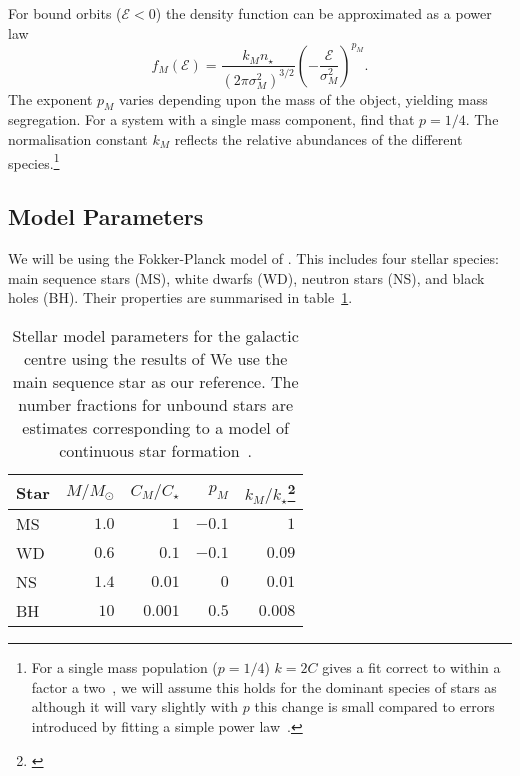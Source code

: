 \documentclass[useAMS,usedcolumn,usegraphicx,usenatbib]{mn2e}
\newcommand{\tabref}[1]{table~\ref{tab:#1}}
\begin{document}
For bound orbits ($\mathcal{E} < 0$) the density function can be approximated as a power law
\begin{equation}
f_M(\mathcal{E}) = \frac{k_M n_\star}{(2\pi\sigma_M^2)^{3/2}}\left(-\frac{\mathcal{E}}{\sigma_M^2}\right)^{p_M}.
\end{equation}
The exponent $p_M$ varies depending upon the mass of the object, yielding mass segregation. For a system with a single mass component, \citet{Bahcall1976} find that $p = 1/4$. The normalisation constant $k_M$ reflects the relative abundances of the different species.\footnote{For a single mass population ($p = 1/4$) $k = 2 C$ gives a fit correct to within a factor a two~\citep{Bahcall1976,Keshet2009}, we will assume this holds for the dominant species of stars as although it will vary slightly with $p$ this change is small compared to errors introduced by fitting a simple power law~\citep{Hopman2006, Alexander2009}.}

\subsection{Model Parameters}

We will be using the Fokker-Planck model of \citet{Hopman2006, Hopman2006a, Alexander2009}. This includes four stellar species: main sequence stars (MS), white dwarfs (WD), neutron stars (NS), and black holes (BH). Their properties are summarised in \tabref{HA}.
\begin{table}
\begin{minipage}{\columnwidth}
 \centering
  \caption{Stellar model parameters for the galactic centre using the results of \citet{Alexander2009} We use the main sequence star as our reference. The number fractions for unbound stars are estimates corresponding to a model of continuous star formation~\citep{Alexander2005}.\label{tab:HA}}
  \begin{tabular}{@{}lrrrr@{}}
  \hline
   Star & $M/M_\odot$ & $C_M/C_\star$ & $p_M$ & $k_M/k_\star$\footnote{\citet{Toonen2009}} \\
 \hline
 MS & $1.0$ & $1$ & $-0.1$ & $1$ \\
 WD & $0.6$ & $0.1$ & $-0.1$ & $0.09$ \\
 NS & $1.4$ & $0.01$ & $0$ & $0.01$  \\
 BH & $10$ & $0.001$ & $0.5$ & $0.008$ \\
\hline
\end{tabular}
\end{minipage}
\end{table}
\end{document}
